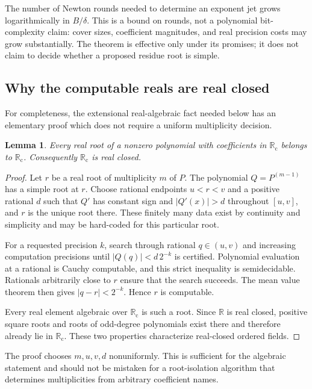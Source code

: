 \documentclass[11pt,letterpaper]{article}
\numberwithin{equation}{section}
\newtheorem{lemma}[theorem]{Lemma}
\theoremstyle{definition}
\theoremstyle{remark}
\newcommand{\Rc}{\mathbb R_{\mathrm c}}
\newcommand{\R}{\mathbb R}
\begin{document}
The number of Newton rounds needed to determine an exponent jet grows
logarithmically in $B/\delta$. This is a bound on rounds, not a polynomial
bit-complexity claim: cover sizes, coefficient magnitudes, and real
precision costs may grow substantially. The theorem is effective only
under its promises; it does not claim to decide whether a proposed residue
root is simple.

\subsection{Why the computable reals are real closed}

For completeness, the extensional real-algebraic fact needed below has an
elementary proof which does not require a uniform multiplicity decision.

\begin{lemma}\label{lem:Rcclosed}
Every real root of a nonzero polynomial with coefficients in $\Rc$ belongs
to $\Rc$. Consequently $\Rc$ is real closed.
\end{lemma}
\begin{proof}
Let $r$ be a real root of multiplicity $m$ of $P$. The polynomial
$Q=P^{(m-1)}$ has a simple root at $r$. Choose rational endpoints $u<r<v$
and a positive rational $d$ such that $Q'$ has constant sign and
$|Q'(x)|>d$ throughout $[u,v]$, and $r$ is the unique root there.
These finitely many data exist by continuity and simplicity and may be
hard-coded for this particular root.

For a requested precision $k$, search through rational $q\in(u,v)$ and
increasing computation precisions until
$|Q(q)|<d\,2^{-k}$ is certified. Polynomial evaluation at a rational is
Cauchy computable, and this strict inequality is semidecidable. Rationals
arbitrarily close to $r$ ensure that the search succeeds. The mean value
theorem then gives $|q-r|<2^{-k}$. Hence $r$ is computable.

Every real element algebraic over $\Rc$ is such a root. Since $\R$ is
real closed, positive square roots and roots of odd-degree polynomials
exist there and therefore already lie in $\Rc$. These two properties
characterize real-closed ordered fields.
\end{proof}

The proof chooses $m,u,v,d$ nonuniformly. This is sufficient for the
algebraic statement and should not be mistaken for a root-isolation
algorithm that determines multiplicities from arbitrary coefficient names.
\end{document}
